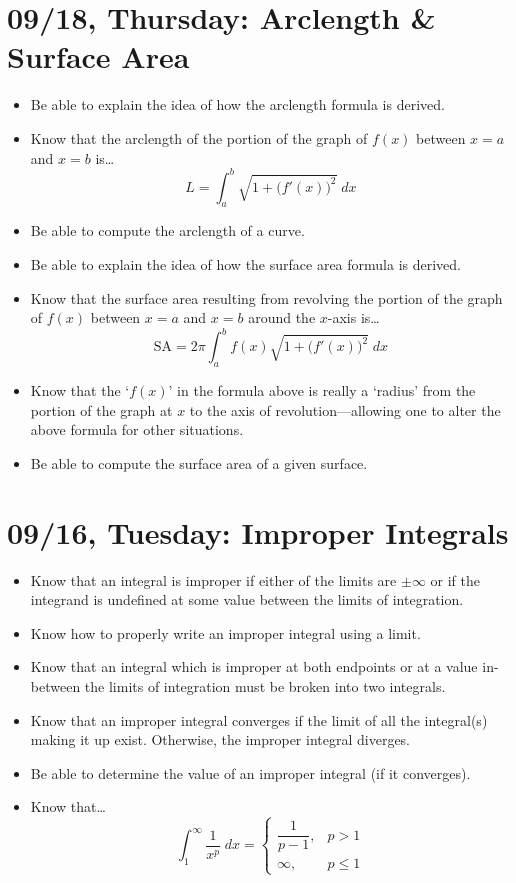 \documentclass[11pt,letterpaper]{article}
\begin{document}
\newpage
\section*{09/18, Thursday: Arclength \& Surface Area\label{09-18}}

\begin{itemize}
\item Be able to explain the idea of how the arclength formula is derived. 
\item Know that the arclength of the portion of the graph of $f(x)$ between $x= a$ and $x= b$ is\dots
	\[
	L= \int_a^b \sqrt{1 + \big( f'(x) \big)^2} \;dx
	\]
\item Be able to compute the arclength of a curve.
\item Be able to explain the idea of how the surface area formula is derived. 
\item Know that the surface area resulting from revolving the portion of the graph of $f(x)$ between $x= a$ and $x= b$ around the $x$-axis is\dots
	\[
	\text{SA}= 2\pi \int_a^b f(x) \sqrt{1 + \big( f'(x) \big)^2} \;dx
	\]
\item Know that the `$f(x)$' in the formula above is really a `radius' from the portion of the graph at $x$ to the axis of revolution---allowing one to alter the above formula for other situations. 
\item Be able to compute the surface area of a given surface. 
\end{itemize}

\newpage
\section*{09/16, Tuesday: Improper Integrals\label{09-16}}

\begin{itemize}
\item Know that an integral is improper if either of the limits are $\pm\infty$ or if the integrand is undefined at some value between the limits of integration.
\item Know how to properly write an improper integral using a limit. 
\item Know that an integral which is improper at both endpoints or at a value in-between the limits of integration must be broken into two integrals. 
\item Know that an improper integral converges if the limit of all the integral(s) making it up exist. Otherwise, the improper integral diverges. 
\item Be able to determine the value of an improper integral (if it converges). 
\item Know that\dots
	\[
	\int_1^\infty \dfrac{1}{x^p} \;dx= \begin{cases} \dfrac{1}{p - 1}, & p > 1 \\ \infty, & p \leq 1 \end{cases}
	\]
\end{itemize}
\end{document}
